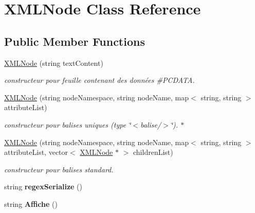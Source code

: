 \hypertarget{class_x_m_l_node}{\section{\-X\-M\-L\-Node \-Class \-Reference}
\label{class_x_m_l_node}
}
\subsection*{\-Public \-Member \-Functions}
\begin{DoxyCompactItemize}
\item 
\hyperlink{class_x_m_l_node_a15451e72788af9e387b7c37e36ae5904}{\-X\-M\-L\-Node} (string text\-Content)
\begin{DoxyCompactList}\small\item\em constructeur pour feuille contenant des données \#\-P\-C\-D\-A\-T\-A. \end{DoxyCompactList}\item 
\hyperlink{class_x_m_l_node_af149f2fbac6fc753db2b5bd19ab581b5}{\-X\-M\-L\-Node} (string node\-Namespace, string node\-Name, map$<$ string, string $>$ attribute\-List)
\begin{DoxyCompactList}\small\item\em constructeur pour balises uniques (type \char`\"{}$<$balise/$>$\char`\"{}). $\ast$ \end{DoxyCompactList}\item 
\hyperlink{class_x_m_l_node_a5c5b1ad7daca4f5944d5270e8db1618f}{\-X\-M\-L\-Node} (string node\-Namespace, string node\-Name, map$<$ string, string $>$ attribute\-List, vector$<$ \hyperlink{class_x_m_l_node}{\-X\-M\-L\-Node} $\ast$ $>$ children\-List)
\begin{DoxyCompactList}\small\item\em constructeur pour balises standard. \end{DoxyCompactList}\item 
\hypertarget{class_x_m_l_node_acb075e6a6bf141ef2d328d677dd77965}{string {\bfseries regex\-Serialize} ()}\label{class_x_m_l_node_acb075e6a6bf141ef2d328d677dd77965}

\item 
\hypertarget{class_x_m_l_node_a63d82e2b63f434f3afb350022359bf23}{string {\bfseries \-Affiche} ()}\label{class_x_m_l_node_a63d82e2b63f434f3afb350022359bf23}


\end{DoxyCompactItemize}

